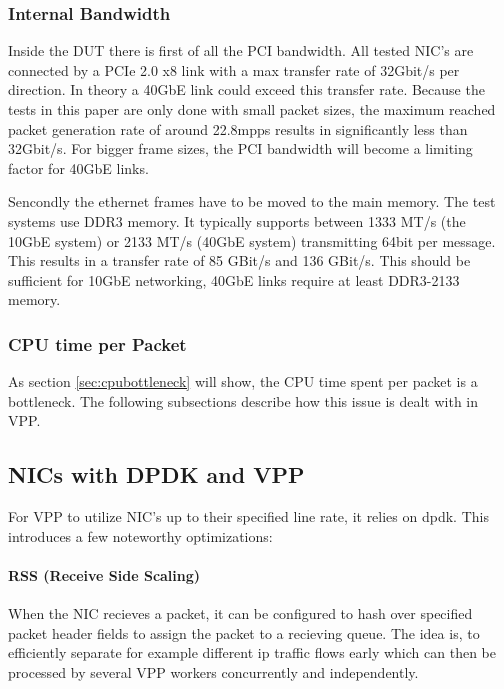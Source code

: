 \subsubsection{Internal Bandwidth}


Inside the DUT there is first of all the PCI bandwidth. All tested
NIC's are connected by a PCIe 2.0 x8 link with a max transfer rate of
32Gbit/s per direction. In theory a 40GbE link could exceed this
transfer rate. Because the tests in this paper are only done with
small packet sizes, the maximum reached packet generation rate of
around 22.8mpps results in significantly less than 32Gbit/s. For
bigger frame sizes, the PCI bandwidth will become a limiting factor
for 40GbE links.


Sencondly the ethernet frames have to be moved to the main memory. The
test systems use DDR3 memory. It typically supports between 1333 MT/s
(the 10GbE system) or 2133 MT/s (40GbE system) transmitting 64bit per
message. This results in a transfer rate of 85 GBit/s and 136 GBit/s.
This should be sufficient for 10GbE networking, 40GbE links
require at least DDR3-2133 memory. 

\subsubsection{CPU time per Packet}

As section \ref{sec:cpubottleneck} will show, the CPU time spent per
packet is a bottleneck. The following subsections describe how this
issue is dealt with in VPP.




\subsection{NICs with DPDK and VPP}

For VPP to utilize NIC's up to their specified line rate, it relies on
\Ac{dpdk}. This introduces a few noteworthy optimizations:

\paragraph{RSS (Receive Side Scaling)}
\label{sec:rss}

When the NIC recieves a packet, it can be configured to hash over
specified packet header fields to assign the packet to a recieving
queue. The idea is, to efficiently separate for example different ip
traffic flows early which can then be processed by several VPP workers
concurrently and independently. \cite{linguaglossa2017high}

